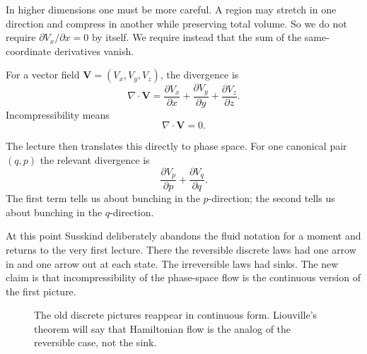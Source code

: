 In higher dimensions one must be more careful. A region may stretch in one direction and compress in another while preserving total volume. So we do not require
\(\partial V_x/\partial x=0\) by itself. We require instead that the sum of the same-coordinate derivatives vanish.

\begin{definition}
For a vector field \(\mathbf V=(V_x,V_y,V_z)\), the divergence is
\begin{equation}
\nabla\cdot\mathbf V
=
\frac{\partial V_x}{\partial x}
+
\frac{\partial V_y}{\partial y}
+
\frac{\partial V_z}{\partial z}.
\end{equation}
Incompressibility means
\begin{equation}
\nabla\cdot\mathbf V=0.
\end{equation}
\end{definition}

The lecture then translates this directly to phase space. For one canonical pair \((q,p)\) the relevant divergence is
\begin{equation}
\frac{\partial V_p}{\partial p}+\frac{\partial V_q}{\partial q}.
\end{equation}
The first term tells us about bunching in the \(p\)-direction; the second tells us about bunching in the \(q\)-direction.

At this point Susskind deliberately abandons the fluid notation for a moment and returns to the very first lecture. There the reversible discrete laws had one arrow in and one arrow out at each state. The irreversible laws had sinks. The new claim is that incompressibility of the phase-space flow is the continuous version of the first picture.

\begin{figure}[h]
\centering
{}
\hspace{1.2cm}
\caption{The old discrete pictures reappear in continuous form. Liouville's theorem will say that Hamiltonian flow is the analog of the reversible case, not the sink.}
\end{figure}

